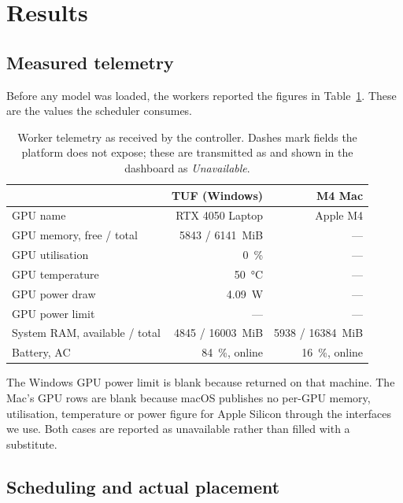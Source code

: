 \section{Results}
\label{sec:results}

\subsection{Measured telemetry}

Before any model was loaded, the workers reported the figures in
Table~\ref{tab:telemetry}. These are the values the scheduler consumes.

\begin{table}[htbp]
\centering\small
\caption{Worker telemetry as received by the controller. Dashes mark fields the
platform does not expose; these are transmitted as  and shown in the
dashboard as \textit{Unavailable}.}
\label{tab:telemetry}
\begin{tabular}{@{}lrr@{}}
\toprule
 & \textbf{TUF (Windows)} & \textbf{M4 Mac} \\
\midrule
GPU name           & RTX 4050 Laptop   & Apple M4 \\
GPU memory, free / total & \SI{5843}{} / \SI{6141}{MiB} & --- \\
GPU utilisation    & \SI{0}{\percent}  & --- \\
GPU temperature    & \SI{50}{\celsius} & --- \\
GPU power draw     & \SI{4.09}{W}      & --- \\
GPU power limit    & ---               & --- \\
System RAM, available / total & \SI{4845}{} / \SI{16003}{MiB} & \SI{5938}{} / \SI{16384}{MiB} \\
Battery, AC        & \SI{84}{\percent}, online & \SI{16}{\percent}, online \\
\bottomrule
\end{tabular}
\end{table}

The Windows GPU power limit is blank because  returned
\code{[N/A]} on that machine. The Mac's GPU rows are blank because macOS
publishes no per-GPU memory, utilisation, temperature or power figure for Apple
Silicon through the interfaces we use. Both cases are reported as unavailable
rather than filled with a substitute.

\subsection{Scheduling and actual placement}

